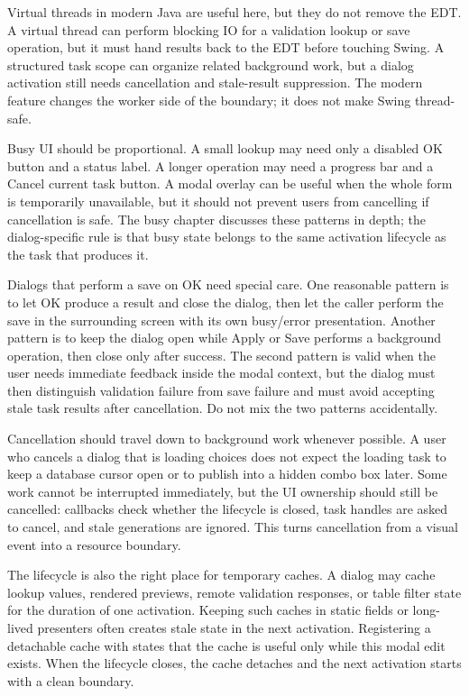 Virtual threads in modern Java are useful here, but they do not remove the EDT.
A virtual thread can perform blocking IO for a validation lookup or save
operation, but it must hand results back to the EDT before touching Swing. A
structured task scope can organize related background work, but a dialog
activation still needs cancellation and stale-result suppression. The modern
feature changes the worker side of the boundary; it does not make Swing
thread-safe.

Busy UI should be proportional. A small lookup may need only a disabled OK
button and a status label. A longer operation may need a progress bar and a
Cancel current task button. A modal overlay can be useful when the whole form
is temporarily unavailable, but it should not prevent users from cancelling if
cancellation is safe. The busy chapter discusses these patterns in depth; the
dialog-specific rule is that busy state belongs to the same activation
lifecycle as the task that produces it.

Dialogs that perform a save on OK need special care. One reasonable pattern is
to let OK produce a result and close the dialog, then let the caller perform
the save in the surrounding screen with its own busy/error presentation.
Another pattern is to keep the dialog open while Apply or Save performs a
background operation, then close only after success. The second pattern is
valid when the user needs immediate feedback inside the modal context, but the
dialog must then distinguish validation failure from save failure and must
avoid accepting stale task results after cancellation. Do not mix the two
patterns accidentally.

Cancellation should travel down to background work whenever possible. A user
who cancels a dialog that is loading choices does not expect the loading task
to keep a database cursor open or to publish into a hidden combo box later.
Some work cannot be interrupted immediately, but the UI ownership should still
be cancelled: callbacks check whether the lifecycle is closed, task handles
are asked to cancel, and stale generations are ignored. This turns cancellation
from a visual event into a resource boundary.

The lifecycle is also the right place for temporary caches. A dialog may cache
lookup values, rendered previews, remote validation responses, or table filter
state for the duration of one activation. Keeping such caches in static fields
or long-lived presenters often creates stale state in the next activation.
Registering a detachable cache with  states that the
cache is useful only while this modal edit exists. When the lifecycle closes,
the cache detaches and the next activation starts with a clean boundary.

